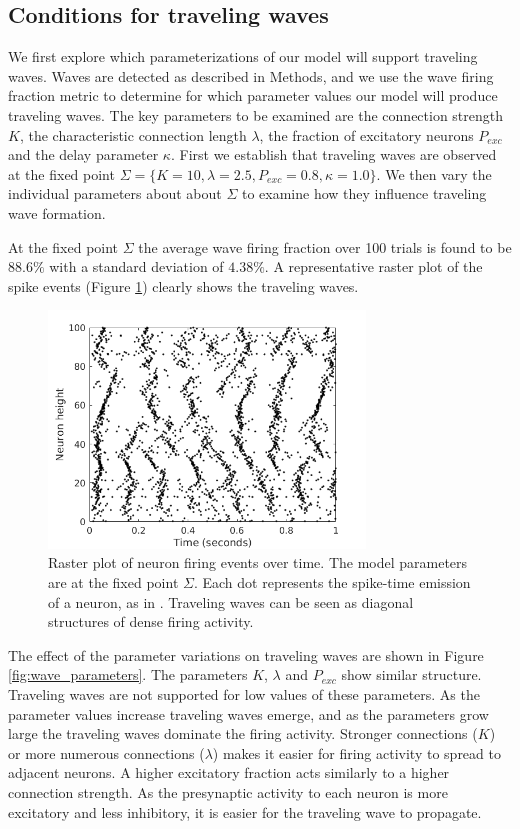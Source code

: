 \documentclass[a4paper,11pt]{article}
\begin{document}
\subsection{Conditions for traveling waves} \label{sub:waves}
We first explore which parameterizations of our model will support traveling waves.
Waves are detected as described in Methods, and we use the wave firing fraction metric to determine for which parameter values our model will produce traveling waves.
The key parameters to be examined are the connection strength $K$, the characteristic connection length $\lambda$, the fraction of excitatory neurons $P_{exc}$ and the delay parameter $\kappa$.
First we establish that traveling waves are observed at the fixed point $\Sigma = \{K=10,\lambda=2.5,P_{exc}=0.8,\kappa=1.0 \}$.
We then vary the individual parameters about about $\Sigma$ to examine how they influence traveling wave formation.

At the fixed point $\Sigma$ the average wave firing fraction over 100 trials is found to be $88.6\%$ with a standard deviation of $4.38\%$.
A representative raster plot of the spike events (Figure \ref{fig:sigma_raster}) clearly shows the traveling waves.
\begin{figure}[!htb]
 \centering
 \includegraphics[width=0.75\textwidth]{fig/baseline}
 \caption{Raster plot of neuron firing events over time. The model parameters are at the fixed point $\Sigma$. Each dot represents the spike-time emission of a neuron, as in \cite{senk2020}. Traveling waves can be seen as diagonal structures of dense firing activity. }
 \label{fig:sigma_raster}
\end{figure}

The effect of the parameter variations on traveling waves are shown in Figure \ref{fig:wave_parameters}.
The parameters $K$, $\lambda$ and $P_{exc}$ show similar structure.
Traveling waves are not supported for low values of these parameters.
As the parameter values increase traveling waves emerge, and as the parameters grow large the traveling waves dominate the firing activity.
Stronger connections ($K$) or more numerous connections ($\lambda$) makes it easier for firing activity to spread to adjacent neurons.
A higher excitatory fraction acts similarly to a higher connection strength. 
As the presynaptic activity to each neuron is more excitatory and less inhibitory, it is easier for the traveling wave to propagate.
\end{document}
